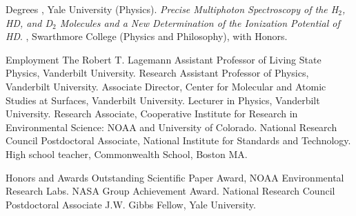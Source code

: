 \begin{rubric}{Degrees}
, Yale University (Physics). \emph{Precise Multiphoton Spectroscopy of the H$_2$, HD, and D$_2$ Molecules and a New Determination of the Ionization Potential of HD}.
, Swarthmore College (Physics and Philosophy), with Honors.
\end{rubric}
\begin{rubric}{Employment}
\entry*[2000--]The Robert T. Lagemann Assistant Professor of Living State Physics, Vanderbilt University.
\entry*[1995--2000]Research Assistant Professor of Physics, Vanderbilt University.
\entry*[1996--1998]Associate Director, Center for Molecular and Atomic Studies at Surfaces, Vanderbilt University.
\entry*[1994--1995]Lecturer in Physics, Vanderbilt University.
\entry*[1993--1994]Research Associate, Cooperative Institute for Research in Environmental Science: NOAA and University of Colorado.
\entry*[1991--1993]National Research Council Postdoctoral Associate, National Institute for Standards and Technology.
\entry*[1983--1985]High school teacher, Commonwealth School, Boston MA.
\end{rubric}
\begin{rubric}{Honors and Awards}
\entry*[1998]Outstanding Scientific Paper Award, NOAA Environmental Research Labs.
\entry*[1995]NASA Group Achievement Award.
\entry*[1991--1993]National Research Council Postdoctoral Associate
\entry*[1985--1986]J.W. Gibbs Fellow, Yale University.
\end{rubric}
